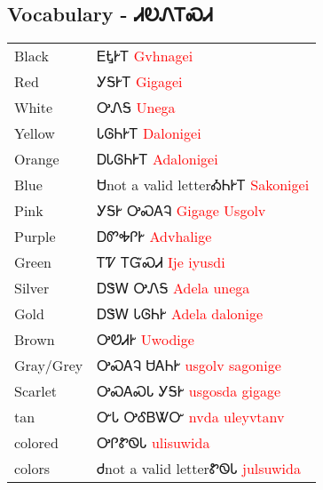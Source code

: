 \begin{multicols}
\newpage\subsection{Vocabulary - ᏗᎧᏁᎢᏍᏗ 
}
\begin{minipage}{\linewidth}
\begin{tabular}{p{5cm} p{9cm}}
Black & ᎬᎿᎨᎢ 
 \newline \textcolor{red}{Gvhnagei}\\
Red & ᎩᎦᎨᎢ 
 \newline \textcolor{red}{Gigagei}\\
White & ᎤᏁᎦ 
 \newline \textcolor{red}{Unega}\\
Yellow & ᏓᎶᏂᎨᎢ 
 \newline \textcolor{red}{Dalonigei}\\
Orange & ᎠᏓᎶᏂᎨᎢ 
 \newline \textcolor{red}{Adalonigei}\\
Blue & Ꮜnot a valid letterᎣᏂᎨᎢ 
 \newline \textcolor{red}{Sakonigei}\\
Pink & ᎩᎦᎨ ᎤᏍᎪᎸ 
 \newline \textcolor{red}{Gigage Usgolv}\\
Purple & ᎠᏛᎭᎵᎨ 
 \newline \textcolor{red}{Advhalige}\\
Green & ᎢᏤ ᎢᏳᏍᏗ 
 \newline \textcolor{red}{Ije iyusdi}\\
Silver & ᎠᏕᎳ ᎤᏁᎦ 
 \newline \textcolor{red}{Adela unega}\\
Gold & ᎠᏕᎳ ᏓᎶᏂᎨ 
 \newline \textcolor{red}{Adela dalonige}\\
Brown & ᎤᏬᏗᎨ 
 \newline \textcolor{red}{Uwodige}\\
Gray/Grey & ᎤᏍᎪᎸ ᏌᎪᏂᎨ 
 \newline \textcolor{red}{usgolv sagonige}\\
Scarlet & ᎤᏍᎪᏍᏓ ᎩᎦᎨ 
 \newline \textcolor{red}{usgosda gigage}\\
tan & ᏅᏓ ᎤᎴᏴᏔᏅ 
 \newline \textcolor{red}{nvda uleyvtanv}\\
colored & ᎤᎵᏑᏫᏓ 
 \newline \textcolor{red}{ulisuwida}\\
colors & Ꮷnot a valid letterᏑᏫᏓ 
 \newline \textcolor{red}{julsuwida}\\
\end{tabular}
\end{minipage}


\end{multicols}
